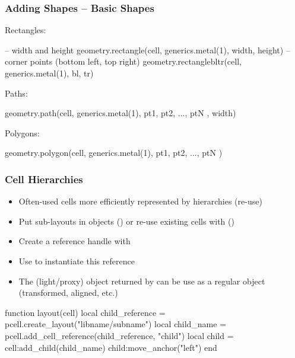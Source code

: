 \documentclass[aspectratio=169, dvipsnames, x11names, svgnames, 11pt]{beamer}
\begin{document}
\begin{frame}[fragile]
    \frametitle{Adding Shapes -- Basic Shapes}
    \centering
    \begin{minipage}{0.15\linewidth}Rectangles:\end{minipage} \hfill \begin{minipage}{0.80\linewidth}
    \begin{luacode}
        -- width and height
        geometry.rectangle(cell, generics.metal(1), 
            width, height)
        -- corner points (bottom left, top right)
        geometry.rectanglebltr(cell, generics.metal(1), 
            bl, tr)
    \end{luacode}\end{minipage}

    \begin{minipage}{0.15\linewidth}Paths:\end{minipage} \hfill \begin{minipage}{0.8\linewidth}
    \begin{luacode}
        geometry.path(cell, generics.metal(1),
            { pt1, pt2, ..., ptN }, width)
    \end{luacode}\end{minipage}

    \begin{minipage}{0.15\linewidth}Polygons:\end{minipage} \hfill \begin{minipage}{0.8\linewidth}
    \begin{luacode}
        geometry.polygon(cell, generics.metal(1),
            { pt1, pt2, ..., ptN })
    \end{luacode}\end{minipage}
\end{frame}

\begin{frame}[fragile]
    \frametitle{Cell Hierarchies}
    \centering
    \begin{itemize}
        \item Often-used cells more efficiently represented by hierarchies (re-use)
        \item Put sub-layouts in objects () or re-use existing cells with ()
        \item Create a reference handle with 
        \item Use  to instantiate this reference
        \item The (light/proxy) object returned by  can be use as a regular object (transformed, aligned, etc.)
    \end{itemize}
    \vfill
    \begin{luacode}
        function layout(cell)
            local child_reference = pcell.create_layout("libname/subname")
            local child_name = pcell.add_cell_reference(child_reference,
                "child")
            local child = cell:add_child(child_name)
            child:move_anchor("left")
        end
    \end{luacode}
\end{frame}
\end{document}
